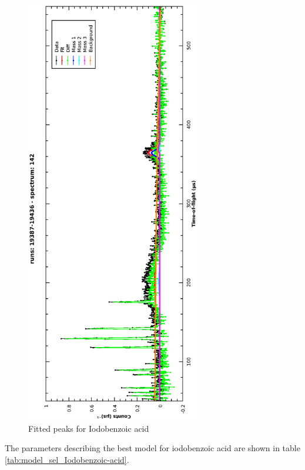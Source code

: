 \documentclass[a4paper]{article}
\begin{document}
\begin{figure}[h!]
  \centering
  \vspace{-60pt}
  \begin{turn}{-90}
    \includegraphics[width=0.68\textwidth]{graphics/model_sel_Iodobenzoic_acid.eps}
  \end{turn}
  \vspace{-60pt}
  \caption{Fitted peaks for Iodobenzoic acid}
  \label{fig:model_sel_Iodobenzoic-acid}
\end{figure}
\FloatBarrier

The parameters describing the best model for iodobenzoic acid are shown in table
\ref{tab:model_sel_Iodobenzoic-acid}.
\end{document}
